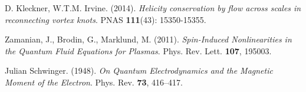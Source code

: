 \begin{thebibliography}{99}
D. Kleckner, W.T.M. Irvine. (2014). \textit{Helicity conservation by flow across scales in reconnecting vortex knots}. PNAS \textbf{111}(43): 15350-15355. 



Zamanian, J., Brodin, G., Marklund, M. (2011). \textit{Spin-Induced Nonlinearities in the Quantum Fluid Equations for Plasmas}. Phys. Rev. Lett. \textbf{107}, 195003. 



Julian Schwinger. (1948). \textit{On Quantum Electrodynamics and the Magnetic Moment of the Electron}. Phys. Rev. \textbf{73}, 416–417. 


\end{thebibliography}

\usepackage{hyperref}
\usepackage{hyperref}
\usepackage{hyperref}
\usepackage{hyperref}
\usepackage{hyperref}
\usepackage{hyperref}
